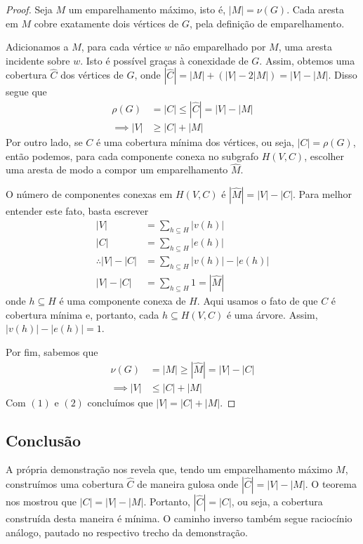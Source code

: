 \documentclass{homework}
\begin{document}
	\begin{proof}
		Seja $M$ um emparelhamento máximo, isto é, $|M| = \nu(G)$. Cada aresta em $M$ cobre exatamente dois vértices de $G$, pela definição de emparelhamento. 
		\begin{fig}
			
		\end{fig}
		Adicionamos a $M$, para cada vértice $w$ não emparelhado por $M$, uma aresta incidente sobre $w$. Isto é possível graças à conexidade de $G$. Assim, obtemos uma cobertura $\hat{C}$ dos vértices de $G$, onde $|\hat{C}| = |M| + (|V| - 2|M|) = |V| - |M|$. Disso segue que
		\begin{align}
		\rho(G) &= |C| \le |\hat{C}| = |V| - |M|\nonumber\\
		\implies |V| &\ge |C| + |M|
		\end{align}
		Por outro lado, se $C$ é uma cobertura mínima dos vértices, ou seja, $|C| = \rho(G)$, então podemos, para cada componente conexa no subgrafo $H(V, C)$, escolher uma aresta de modo a compor um emparelhamento $\hat{M}$.
		\begin{fig}
		 	
		\end{fig}
		O número de componentes conexas em $H(V, C)$ é $|\hat{M}| = |V| - |C|$. Para melhor entender este fato, basta escrever \begin{align*}
		|V| &= \sum_{h \subseteq H} |v(h)|\\
		|C| &= \sum_{h \subseteq H} |e(h)|\\
		\therefore |V| - |C| &= \sum_{h \subseteq H} |v(h)| - |e(h)|\\
		|V| - |C| &= \sum_{h \subseteq H} 1 = |\hat{M}|
		\end{align*}
		onde $h \subseteq H$ é uma componente conexa de $H$. Aqui usamos o fato de que $C$ é cobertura mínima e, portanto, cada $h \subseteq H(V, C)$ é uma árvore. Assim, $|v(h)| - |e(h)| = 1$.\par
		
		Por fim, sabemos que
		\begin{align}
		\nu(G) &= |M| \ge |\hat{M}| = |V| - |C|\nonumber\\
		\implies |V| &\le |C| + |M|
		\end{align}
		Com $(1)$ e $(2)$ concluímos que $|V| = |C| + |M|$.
	\end{proof}
	\subsection*{Conclusão}
		A própria demonstração nos revela que, tendo um emparelhamento máximo $M$, construímos uma cobertura $\hat{C}$ de maneira gulosa onde $|\hat{C}| = |V| - |M|$. O teorema nos mostrou que $|C| = |V| - |M|$. Portanto, $|\hat{C}| = |C|$, ou seja, a cobertura construída desta maneira é mínima. O caminho inverso também segue raciocínio análogo, pautado no respectivo trecho da demonstração.
	
\end{document}

